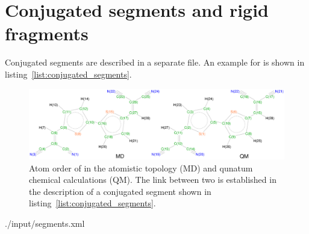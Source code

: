 \section{Conjugated segments and rigid fragments}

Conjugated segments are described in a separate \xml file. An example for \dcvt is shown in listing~\ref{list:conjugated_segments}.



\clearpage
\begin{figure}[ht]
\centering
\includegraphics[width=\textwidth]{./fig/chemical_structure/dcv2t_gaussian} 
\caption{\small Atom order of \dcvt in the atomistic topology (MD) and qunatum chemical calculations (QM). The  link between two is established in the description of a conjugated segment shown in listing~\ref{list:conjugated_segments}.}
\label{fig:dcv2t_qm}
\end{figure}


%
{./input/segments.xml}
\clearpage


